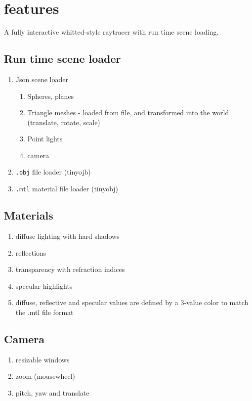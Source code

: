 \section{features}
A fully interactive whitted-style raytracer with run time scene loading.

\subsection{Run time scene loader}
    \begin{enumerate}
    \item Json scene loader
        \begin{enumerate}
        \item Spheres, planes
        \item Triangle meshes - loaded from file, and transformed into the world (translate, rotate, scale)
        \item Point lights
        \item camera
        \end{enumerate}
    \item \verb|.obj| file loader (tinyojb)
    \item \verb|.mtl| material file loader (tinyobj)
    \end{enumerate}

\subsection{Materials}
    \begin{enumerate}
    \item diffuse lighting with hard shadows
    \item reflections
    \item transparency with refraction indices
    \item specular highlights
    \item diffuse, reflective and specular values are defined by a 3-value color to match the .mtl file format
    \end{enumerate}

\subsection{Camera}
    \begin{enumerate}
    \item resizable windows
    \item zoom (mousewheel)
    \item pitch, yaw and translate
    \end{enumerate}

